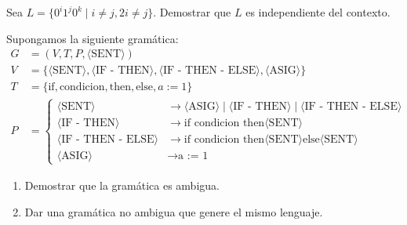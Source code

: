 \begin{ejercicio}\label{ej:1.4.21}
    Sea $L = \{ 0^i 1^j 0^k \mid i \neq j, 2i \neq j \}$. Demostrar que $L$ es independiente del contexto.
\end{ejercicio}

\begin{ejercicio}\label{ej:1.4.22}
    Supongamos la siguiente gramática:
    \begin{align*}
        G&=\left( V,T,P,\langle \text{SENT} \rangle \right)\\
        V&=\{ \langle \text{SENT} \rangle, \langle \text{IF - THEN} \rangle, \langle \text{IF - THEN - ELSE} \rangle, \langle \text{ASIG} \rangle \}\\
        T&=\{ \text{if}, \text{condicion}, \text{then}, \text{else}, a := 1 \} \\
        P&=\left\{
            \begin{aligned}
                \langle \text{SENT} \rangle &\rightarrow \langle \text{ASIG} \rangle \mid \langle \text{IF - THEN} \rangle \mid \langle \text{IF - THEN - ELSE} \rangle\\
                \langle \text{IF - THEN} \rangle &\rightarrow \text{if condicion then} \langle \text{SENT} \rangle\\
                \langle \text{IF - THEN - ELSE} \rangle &\rightarrow \text{if condicion then} \langle \text{SENT} \rangle \text{else} \langle \text{SENT} \rangle\\
                \langle \text{ASIG} \rangle &\rightarrow \text{a := 1}
            \end{aligned}
        \right.
    \end{align*}
    \begin{enumerate}
        \item Demostrar que la gramática es ambigua.
        \item Dar una gramática no ambigua que genere el mismo lenguaje.
    \end{enumerate}
\end{ejercicio}

